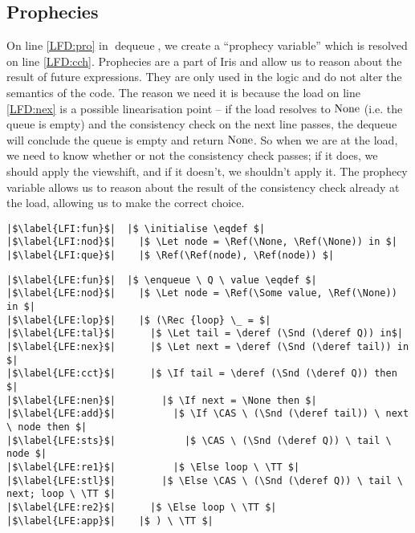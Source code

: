 \documentclass[a4paper, 10pt]{report}
\theoremstyle{definition}
\newcommand{\initialise}{\operatorname{initialize}}
\newcommand{\enqueue}{\operatorname{enqueue}}
\newcommand{\dequeue}{\operatorname{dequeue}}
\begin{document}
\subsection{Prophecies}
On line \ref{LFD:pro} in $\dequeue$, we create a ``prophecy variable'' which is resolved on line \ref{LFD:cch}. Prophecies are a part of Iris and allow us to reason about the result of future expressions. They are only used in the logic and do not alter the semantics of the code. The reason we need it is because the load on line \ref{LFD:nex} is a possible linearisation point -- if the load resolves to $\operatorname{None}$ (i.e. the queue is empty) and the consistency check on the next line passes, the dequeue will conclude the queue is empty and return $\operatorname{None}$. So when we are at the load, we need to know whether or not the consistency check passes; if it does, we should apply the viewshift, and if it doesn't, we shouldn't apply it. The prophecy variable allows us to reason about the result of the consistency check already at the load, allowing us to make the correct choice.

\begin{verbatim}
|$\label{LFI:fun}$|  |$ \initialise \eqdef $|
|$\label{LFI:nod}$|    |$ \Let node = \Ref(\None, \Ref(\None)) in $|
|$\label{LFI:que}$|    |$ \Ref(\Ref(node), \Ref(node)) $|
\end{verbatim}

\begin{verbatim}
|$\label{LFE:fun}$|  |$ \enqueue \ Q \ value \eqdef $|
|$\label{LFE:nod}$|    |$ \Let node = \Ref(\Some value, \Ref(\None)) in $|
|$\label{LFE:lop}$|    |$ (\Rec {loop} \_ = $|
|$\label{LFE:tal}$|      |$ \Let tail = \deref (\Snd (\deref Q)) in$|
|$\label{LFE:nex}$|      |$ \Let next = \deref (\Snd (\deref tail)) in $|
|$\label{LFE:cct}$|      |$ \If tail = \deref (\Snd (\deref Q)) then $|
|$\label{LFE:nen}$|        |$ \If next = \None then $|
|$\label{LFE:add}$|          |$ \If \CAS \ (\Snd (\deref tail)) \ next \ node then $|
|$\label{LFE:sts}$|            |$ \CAS \ (\Snd (\deref Q)) \ tail \ node $|
|$\label{LFE:re1}$|          |$ \Else loop \ \TT $|
|$\label{LFE:stl}$|        |$ \Else \CAS \ (\Snd (\deref Q)) \ tail \ next; loop \ \TT $|
|$\label{LFE:re2}$|      |$ \Else loop \ \TT $|
|$\label{LFE:app}$|    |$ ) \ \TT $|
\end{verbatim}
\end{document}
